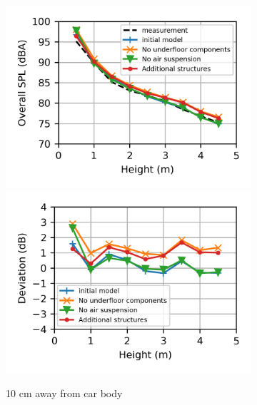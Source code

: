 \begin{figure}[H]
	\centering
	\begin{subfigure}[b]{\textwidth}
		\centering
		\includegraphics{fig/chap5/geometry_variation/overall_SPL/pos_a.png}
		\hfill
		\includegraphics{fig/chap5/geometry_variation/overall_SPL/pos_a_deviation.png}
		\caption{10 cm away from car body}
	\end{subfigure}
	\\
	\begin{subfigure}[b]{\textwidth}
		\centering

\end{subfigure}
\end{figure}
